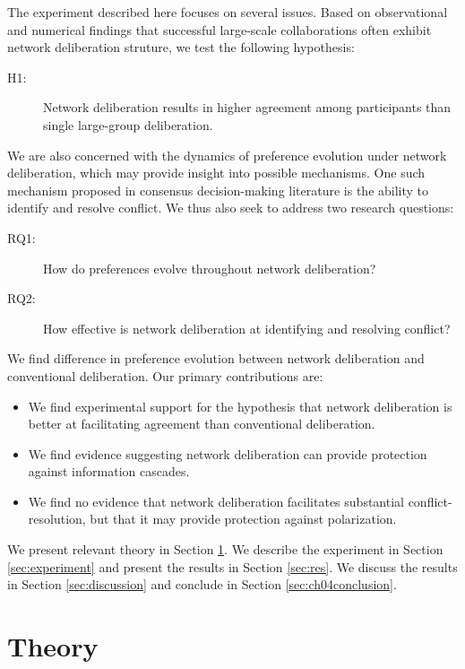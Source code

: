 The experiment described here focuses on several issues.
Based on observational and numerical findings that successful large-scale collaborations often exhibit network deliberation struture, we test the following hypothesis:
\begin{description}
\item[H1:] Network deliberation results in higher agreement among participants than single large-group deliberation.
\end{description}
We are also concerned with the dynamics of preference evolution under network deliberation, which may provide insight into possible mechanisms.
One such mechanism proposed in consensus decision-making literature is the ability to identify and resolve conflict.
We thus also seek to address two research questions:
\begin{description}
\item[RQ1:] How do preferences evolve throughout network deliberation?
\item[RQ2:] How effective is network deliberation at identifying and resolving conflict?
\end{description}

We find difference in preference evolution between network deliberation and conventional deliberation. Our primary contributions are:
\begin{itemize}
    \item We find experimental support for the hypothesis that network deliberation is better at facilitating agreement than conventional deliberation.
    \item We find evidence suggesting network deliberation can provide protection against information cascades.
    \item We find no evidence that network deliberation facilitates substantial conflict-resolution, but that it may provide protection against polarization.
\end{itemize}

We present relevant theory in Section \ref{sec:theory}.
We describe the experiment in Section \ref{sec:experiment} and present the results in Section \ref{sec:res}.
We discuss the results in Section \ref{sec:discussion} and conclude in Section \ref{sec:ch04conclusion}.

\section{Theory}
\label{sec:theory}
